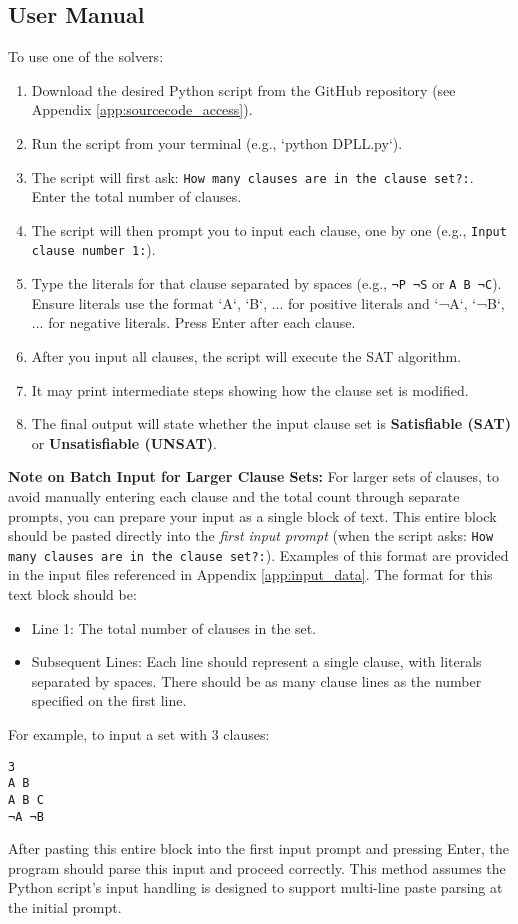 \documentclass[11pt, a4paper]{article}
\begin{document}
\subsection*{User Manual}
To use one of the solvers:
\begin{enumerate}
    \item Download the desired Python script from the GitHub repository (see Appendix \ref{app:sourcecode_access}).
    \item Run the script from your terminal (e.g., `python DPLL.py`).
    \item The script will first ask: \texttt{How many clauses are in the clause set?:}. Enter the total number of clauses.
    \item The script will then prompt you to input each clause, one by one (e.g., \texttt{Input clause number 1:}).
    \item Type the literals for that clause separated by spaces (e.g., \texttt{¬P ¬S} or \texttt{A B ¬C}). Ensure literals use the format `A`, `B`, ... for positive literals and `¬A`, `¬B`, ... for negative literals. Press Enter after each clause.
    \item After you input all clauses, the script will execute the SAT algorithm.
    \item It may print intermediate steps showing how the clause set is modified.
    \item The final output will state whether the input clause set is \textbf{Satisfiable (SAT)} or \textbf{Unsatisfiable (UNSAT)}.
\end{enumerate}
\textbf{Note on Batch Input for Larger Clause Sets:}
For larger sets of clauses, to avoid manually entering each clause and the total count through separate prompts, you can prepare your input as a single block of text. This entire block should be pasted directly into the \textit{first input prompt} (when the script asks: \texttt{How many clauses are in the clause set?:}). Examples of this format are provided in the input files referenced in Appendix \ref{app:input_data}. The format for this text block should be:
\begin{itemize}
    \item Line 1: The total number of clauses in the set.
    \item Subsequent Lines: Each line should represent a single clause, with literals separated by spaces. There should be as many clause lines as the number specified on the first line.
\end{itemize}
For example, to input a set with 3 clauses:
\begin{verbatim}
3
A B
A B C
¬A ¬B
\end{verbatim}
After pasting this entire block into the first input prompt and pressing Enter, the program should parse this input and proceed correctly. This method assumes the Python script's input handling is designed to support multi-line paste parsing at the initial prompt.
\end{document}
